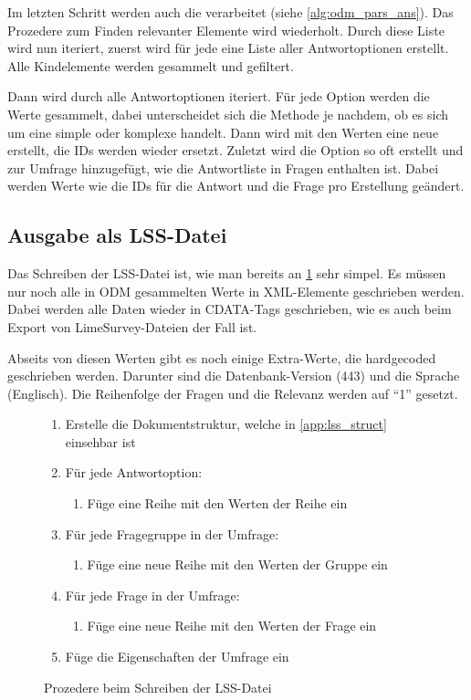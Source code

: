 Im letzten Schritt werden auch die  verarbeitet (siehe \cref{alg:odm_pars_ans}).
Das Prozedere zum Finden relevanter Elemente wird wiederholt.
Durch diese Liste wird nun iteriert, zuerst wird für jede  eine Liste aller Antwortoptionen erstellt.
Alle Kindelemente werden gesammelt und gefiltert.

Dann wird durch alle Antwortoptionen iteriert.
Für jede Option werden die Werte gesammelt, dabei unterscheidet sich die Methode je nachdem, ob es sich um eine simple oder komplexe  handelt.
Dann wird mit den Werten eine neue  erstellt, die IDs werden wieder ersetzt.
Zuletzt wird die Option so oft erstellt und zur Umfrage hinzugefügt, wie die Antwortliste in Fragen enthalten ist.
Dabei werden Werte wie die IDs für die Antwort und die Frage pro Erstellung geändert.


\subsection{Ausgabe als LSS-Datei}

Das Schreiben der LSS-Datei ist, wie man bereits an \cref{alg:lss_write} sehr simpel.
Es müssen nur noch alle in ODM gesammelten Werte in XML-Elemente geschrieben werden.
Dabei werden alle Daten wieder in CDATA-Tags geschrieben, wie es auch beim Export von LimeSurvey-Dateien der Fall ist.

Abseits von diesen Werten gibt es noch einige Extra-Werte, die hardgecoded geschrieben werden.
Darunter sind die Datenbank-Version (443) und die Sprache (Englisch).
Die Reihenfolge der Fragen und die Relevanz werden auf \enquote{1} gesetzt.

\begin{figure}[t]
	\begin{enumerate}
		\item Erstelle die Dokumentstruktur, welche in \cref{app:lss_struct} einsehbar ist
		\item Für jede Antwortoption:
			\begin{enumerate}
				\item Füge eine Reihe mit den Werten der Reihe ein
			\end{enumerate}
		\item Für jede Fragegruppe in der Umfrage:
			\begin{enumerate}
				\item Füge eine neue Reihe mit den Werten der Gruppe ein
			\end{enumerate}
		\item Für jede Frage in der Umfrage:
			\begin{enumerate}
				\item Füge eine neue Reihe mit den Werten der Frage ein
			\end{enumerate}
		\item Füge die Eigenschaften der Umfrage ein
	\end{enumerate}
	\caption{Prozedere beim Schreiben der LSS-Datei}
	\label{alg:lss_write}
\end{figure}

